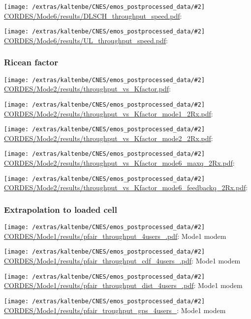 \documentclass[a4paper,10pt]{article}
\newcommand{\printfile}[2][]{
 \begin{minipage}{8cm}
  \centering
  \texttt{[image: /extras/kaltenbe/CNES/emos\_postprocessed\_data/\#2]}
  \url{#2}: #1

 \end{minipage}
}
\begin{document}
\printfile{CORDES/Mode6/results/DLSCH_throughput_speed.pdf}
\printfile{CORDES/Mode6/results/UL_throughput_speed.pdf}


\subsubsection{Ricean factor}

\printfile{CORDES/Mode2/results/throughput_vs_Kfactor.pdf}

\printfile{CORDES/Mode2/results/throughput_vs_Kfactor_mode1_2Rx.pdf}
\printfile{CORDES/Mode2/results/throughput_vs_Kfactor_mode2_2Rx.pdf}

\printfile{CORDES/Mode2/results/throughput_vs_Kfactor_mode6_maxq_2Rx.pdf}
\printfile{CORDES/Mode2/results/throughput_vs_Kfactor_mode6_feedbackq_2Rx.pdf}


\subsubsection{Extrapolation to loaded cell}

\printfile[Mode1 modem]{CORDES/Mode1/results/pfair_throughput_4users_.pdf}
\printfile[Mode1 modem]{CORDES/Mode1/results/pfair_throughput_cdf_4users_.pdf}

\printfile[Mode1 modem]{CORDES/Mode1/results/pfair_throughput_dist_4users_.pdf}
\printfile[Mode1 modem]{CORDES/Mode1/results/pfair_troughput_gps_4users_}
\end{document}

